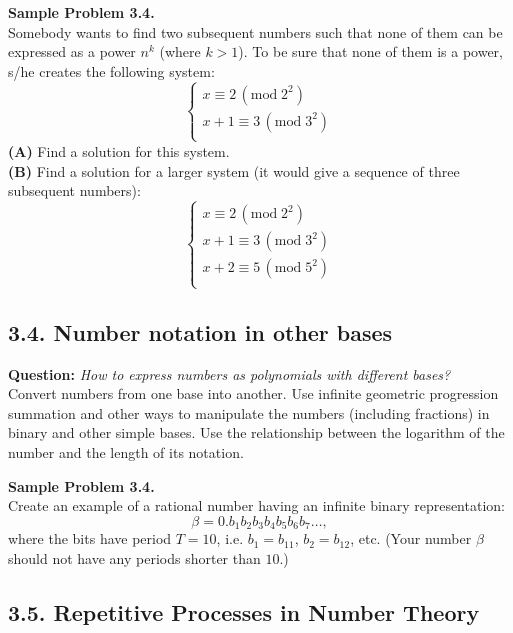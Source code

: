 \documentclass[jou]{apa6}
\begin{document}
\vspace{6pt}
{\bf Sample Problem 3.4.}\\
Somebody wants to find two subsequent numbers such that 
none of them can be expressed as a power $n^k$ (where $k>1$). 
To be sure that none of them is a power, s/he creates the following system: 
$$\left\{ \begin{array}{l} 
x \equiv 2\,(\text{mod}\;2^2)\\
x+1 \equiv 3\,(\text{mod}\;3^2)\\
\end{array} \right.$$
{\bf (A)} Find a solution for this system.\\
{\bf (B)} Find a solution for a larger system (it would give a sequence of three
subsequent numbers): 
$$\left\{ \begin{array}{l} 
x \equiv 2\,(\text{mod}\;2^2)\\
x+1 \equiv 3\,(\text{mod}\;3^2)\\
x+2 \equiv 5\,(\text{mod}\;5^2)\\
\end{array} \right.$$



\subsection{3.4. Number notation in other bases}

{\bf Question:} {\em How to express numbers as polynomials with different bases?}\\
{\scriptsize 
Convert numbers from one base into another. Use infinite geometric progression 
summation and other ways to manipulate the numbers (including fractions) 
in binary and other simple bases. Use the relationship between 
the logarithm of the number and the length of its notation.
}

\vspace{6pt}
{\bf Sample Problem 3.4.}\\
Create an example of a rational number having an infinite binary representation: 
$$\beta = 0.b_1b_2b_3b_4b_5b_6b_7\ldots,$$
where the bits have period $T = 10$, i.e. $b_1 = b_{11}$, $b_2 = b_{12}$, etc. 
(Your number $\beta$ should not have any periods shorter than $10$.)



\subsection{3.5. Repetitive Processes in Number Theory} 
\end{document}
